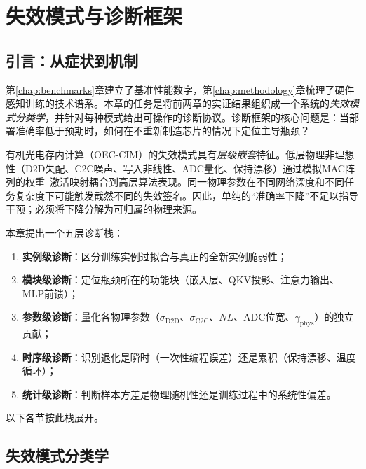 
\chapter{失效模式与诊断框架}
\label{ch:failure_modes}

\section{引言：从症状到机制}

第\ref{chap:benchmarks}章建立了基准性能数字，第\ref{chap:methodology}章梳理了硬件感知训练的技术谱系。本章的任务是将前两章的实证结果组织成一个系统的\emph{失效模式分类学}，并针对每种模式给出可操作的诊断协议。诊断框架的核心问题是：当部署准确率低于预期时，如何在不重新制造芯片的情况下定位主导瓶颈？

有机光电存内计算（OEC-CIM）的失效模式具有\emph{层级嵌套}特征。低层物理非理想性（D2D失配、C2C噪声、写入非线性、ADC量化、保持漂移）通过模拟MAC阵列的权重--激活映射耦合到高层算法表现。同一物理参数在不同网络深度和不同任务复杂度下可能触发截然不同的失效签名。因此，单纯的“准确率下降”不足以指导干预；必须将下降分解为可归属的物理来源。

本章提出一个五层诊断栈：
\begin{enumerate}
    \item \textbf{实例级诊断}：区分训练实例过拟合与真正的全新实例脆弱性；
    \item \textbf{模块级诊断}：定位瓶颈所在的功能块（嵌入层、QKV投影、注意力输出、MLP前馈）；
    \item \textbf{参数级诊断}：量化各物理参数（$\sigma_{\mathrm{D2D}}$、$\sigma_{\mathrm{C2C}}$、$NL$、ADC位宽、$\gamma_{\mathrm{phys}}$）的独立贡献；
    \item \textbf{时序级诊断}：识别退化是瞬时（一次性编程误差）还是累积（保持漂移、温度循环）；
    \item \textbf{统计级诊断}：判断样本方差是物理随机性还是训练过程中的系统性偏差。
\end{enumerate}

以下各节按此栈展开。


\section{失效模式分类学}
\label{sec:failure_taxonomy}

